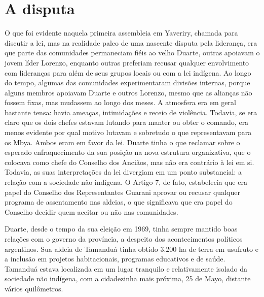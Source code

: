 {{\section{A disputa}

O que foi evidente naquela primeira assembleia em Yaveriry, chamada para
discutir a lei, mas na realidade palco de uma nascente disputa pela
liderança, era que parte das comunidades permaneciam fiéis ao velho
Duarte, outras apoiavam o jovem líder Lorenzo, enquanto outras
preferiam recusar qualquer envolvimento com lideranças para além de
seus grupos locais ou com a lei indígena. Ao longo do tempo, algumas
das comunidades experimentaram divisões internas, porque alguns membros
apoiavam Duarte e outros Lorenzo, mesmo que as alianças não fossem
fixas, mas mudassem ao longo dos meses. A atmosfera era em geral
bastante tensa: havia ameaças, intimidações e receio de violência.
Todavia, se era claro que os dois chefes estavam lutando para manter ou
obter o comando, era menos evidente por qual motivo lutavam e sobretudo
o que representavam para os Mbya. Ambos eram em favor da lei. Duarte
tinha o que reclamar sobre o esperado enfraquecimento da sua posição na
nova estrutura organizativa, que o colocava como chefe do Conselho dos
Anciãos, mas não era contrário à lei em si. Todavia, as suas
interpretações da lei divergiam em um ponto substancial: a relação com
a sociedade não indígena. O Artigo 7, de fato, estabelecia que era
papel do Conselho dos Representantes Guarani aprovar ou recusar
qualquer programa de assentamento nas aldeias, o que significava que
era papel do Conselho decidir quem aceitar ou não nas comunidades.

Duarte, desde o tempo da sua eleição em 1969, tinha sempre mantido boas
relações com o governo da província, a despeito dos acontecimentos
políticos argentinos. Sua aldeia de Tamanduá tinha obtido 3.200 ha de
terra em usufruto e a inclusão em projetos habitacionais, programas
educativos e de saúde. Tamanduá estava localizada em um lugar tranquilo
e relativamente isolado da sociedade não indígena, com a cidadezinha
mais próxima, 25 de Mayo, distante vários quilômetros. 

}}
